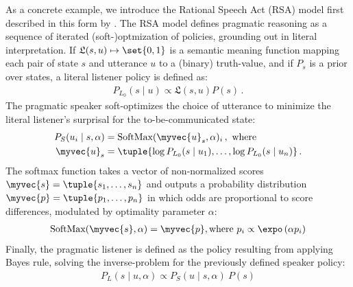 \documentclass[fleqn]{article}
\begin{document}
As a concrete example, we introduce the Rational Speech Act (RSA) model first described in this form by \citet{FrankGoodman2012:Predicting-Prag} \citep[for overview see][]{FrankeJager2015:Probabilistic-p,GoodmanFrank2016:Pragmatic-Langu,StevensBenz2018:Game-Theoretic-,ScontrasTessler2021:A-practical-int,Degen2023:The-Rational-Sp}.
The RSA model defines pragmatic reasoning as a sequence of iterated (soft-)optmization of policies, grounding out in literal interpretation.
If $\mathfrak{L}(s,u) \mapsto \set{0,1}$ is a semantic meaning function mapping each pair of state $s$ and utterance $u$ to a (binary) truth-value, and if $P_{s}$ is a prior over states, a literal listener policy is defined as:
%
\begin{align*}
 P_{L_{0}}(s \mid u) \propto \mathfrak{L}(s,u) P(s)\,.
\end{align*}
%
The pragmatic speaker soft-optimizes the choice of utterance to minimize the literal listener's surprisal for the to-be-communicated state:
%
\begin{align*}
  P_{S}(u_{i} \mid s, \alpha) & = \text{SoftMax}(\myvec{u}_{s}, \alpha)_{i}\,, \text{ where } \\
  \myvec{u}_{s} & = \tuple{\log P_{L_{0}}(s \mid u_{1}), \dots , \log P_{L_{0}}(s \mid u_{n})}\,.
\end{align*}
%
The softmax function \citep[c.f.,][]{FrankeDegen2023:The-softmax-fun} takes a vector of non-normalized scores $\myvec{s} = \tuple{s_{1}, \dots, s_{n}}$ and outputs a probability distribution $\myvec{p} = \tuple{p_{1}, \dots, p_{n}}$ in which odds are proportional to score differences, modulated by optimality parameter $\alpha$:
%
\begin{align*}
 \text{SoftMax}(\myvec{s}, \alpha) = \myvec{p}, \text{where } p_{i} \propto \expo \left (\alpha p_{i} \right )
\end{align*}
%
Finally, the pragmatic listener is defined as the policy resulting from applying Bayes rule, solving the inverse-problem for the previously defined speaker policy:
%
\begin{align*}
  P_{L}(s \mid u, \alpha) \propto  P_{S}(u \mid s, \alpha) \  P(s)
\end{align*}
\end{document}
